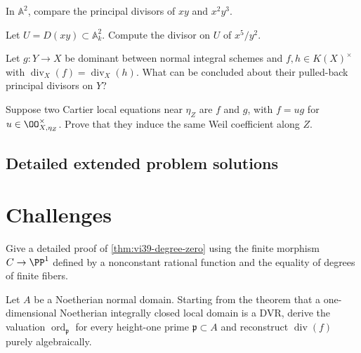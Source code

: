 \begin{problem}\label{prob:vi39-p9}
In \(\mathbb{A}^2\), compare the principal divisors of \(xy\) and \(x^2y^3\).
\end{problem}
\begin{problem}\label{prob:vi39-p10}
Let \(U=D(xy)\subset\mathbb{A}^2_k\).  Compute the divisor on \(U\) of \(x^5/y^2\).
\end{problem}
\begin{problem}\label{prob:vi39-p11}
Let \(g:Y\to X\) be dominant between normal integral schemes and \(f,h\in K(X)^\times\) with \(\operatorname{div}_X(f)=\operatorname{div}_X(h)\).  What can be concluded about their pulled-back principal divisors on \(Y\)?
\end{problem}
\begin{problem}\label{prob:vi39-p12}
Suppose two Cartier local equations near \(\eta_Z\) are \(f\) and \(g\), with \(f=ug\) for \(u\in\OO_{X,\eta_Z}^\times\).  Prove that they induce the same Weil coefficient along \(Z\).
\end{problem}
\ifdefined\FullProblemDossiers
\subsection*{Detailed extended problem solutions}

\fi
\section{Challenges}
\begin{problem}\label{chal:vi39-1}
Give a detailed proof of \cref{thm:vi39-degree-zero} using the finite morphism \(C\to\PP^1\) defined by a nonconstant rational function and the equality of degrees of finite fibers.
\end{problem}

\begin{problem}\label{chal:vi39-2}
Let \(A\) be a Noetherian normal domain.  Starting from the theorem that a one-dimensional Noetherian integrally closed local domain is a DVR, derive the valuation \(\operatorname{ord}_{\mathfrak p}\) for every height-one prime \(\mathfrak p\subset A\) and reconstruct \(\operatorname{div}(f)\) purely algebraically.
\end{problem}

